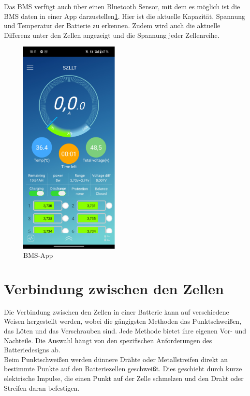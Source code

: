 Das BMS verfügt auch über einen Bluetooth Sensor, mit dem es möglich ist die BMS daten in einer App darzustellen\ref{fig:21}.
Hier ist die aktuelle Kapazität, Spannung und Temperatur der Batterie zu erkennen.
Zudem wird auch die aktuelle Differenz unter den Zellen angezeigt und die Spannung jeder Zellenreihe.
\begin{figure}[h]
    \centering
    \includegraphics[width=5cm]{images/BMS}
    \caption{BMS-App\cite{lorenz_scherrer_selbst_2023}}%
    \label{fig:21}
\end{figure}


\section{Verbindung zwischen den Zellen}

Die Verbindung zwischen den Zellen in einer Batterie kann auf verschiedene Weisen hergestellt werden, wobei die gängigsten Methoden das Punktschweißen, das Löten und das Verschrauben sind.
Jede Methode bietet ihre eigenen Vor- und Nachteile.
Die Auswahl hängt von den spezifischen Anforderungen des Batteriedesigns ab.\\

Beim Punktschweißen werden dünnere Drähte oder Metallstreifen direkt an bestimmte Punkte auf den Batteriezellen geschweißt.
Dies geschieht durch kurze elektrische Impulse, die einen Punkt auf der Zelle schmelzen und den Draht oder Streifen daran befestigen.\\

